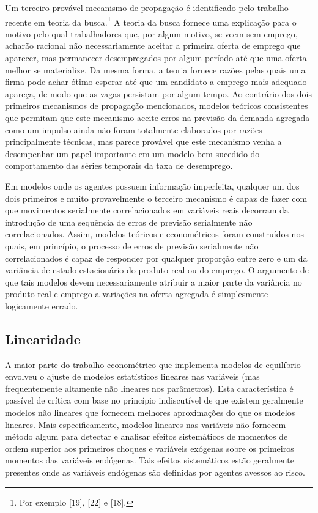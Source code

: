 \documentclass[12pt]{article}
\begin{document}
Um terceiro provável mecanismo de propagação é identificado pelo trabalho recente em teoria da busca.\footnote{Por exemplo [19], [22] e [18].} A teoria da busca fornece uma explicação para o motivo pelo qual trabalhadores que, por algum motivo, se veem sem emprego, acharão racional não necessariamente aceitar a primeira oferta de emprego que aparecer, mas permanecer desempregados por algum período até que uma oferta melhor se materialize. Da mesma forma, a teoria fornece razões pelas quais uma firma pode achar ótimo esperar até que um candidato a emprego mais adequado apareça, de modo que as vagas persistam por algum tempo. Ao contrário dos dois primeiros mecanismos de propagação mencionados, modelos teóricos consistentes que permitam que este mecanismo aceite erros na previsão da demanda agregada como um impulso ainda não foram totalmente elaborados por razões principalmente técnicas, mas parece provável que este mecanismo venha a desempenhar um papel importante em um modelo bem-sucedido do comportamento das séries temporais da taxa de desemprego.

Em modelos onde os agentes possuem informação imperfeita, qualquer um dos dois primeiros e muito provavelmente o terceiro mecanismo é capaz de fazer com que movimentos serialmente correlacionados em variáveis reais decorram da introdução de uma sequência de erros de previsão serialmente não correlacionados. Assim, modelos teóricos e econométricos foram construídos nos quais, em princípio, o processo de erros de previsão serialmente não correlacionados é capaz de responder por qualquer proporção entre zero e um da variância de estado estacionário do produto real ou do emprego. O argumento de que tais modelos devem necessariamente atribuir a maior parte da variância no produto real e emprego a variações na oferta agregada é simplesmente logicamente errado.

\subsection{Linearidade}

A maior parte do trabalho econométrico que implementa modelos de equilíbrio envolveu o ajuste de modelos estatísticos lineares nas variáveis (mas frequentemente altamente não lineares nos parâmetros). Esta característica é passível de crítica com base no princípio indiscutível de que existem geralmente modelos não lineares que fornecem melhores aproximações do que os modelos lineares. Mais especificamente, modelos lineares nas variáveis não fornecem método algum para detectar e analisar efeitos sistemáticos de momentos de ordem superior aos primeiros choques e variáveis exógenas sobre os primeiros momentos das variáveis endógenas. Tais efeitos sistemáticos estão geralmente presentes onde as variáveis endógenas são definidas por agentes avessos ao risco.
\end{document}
